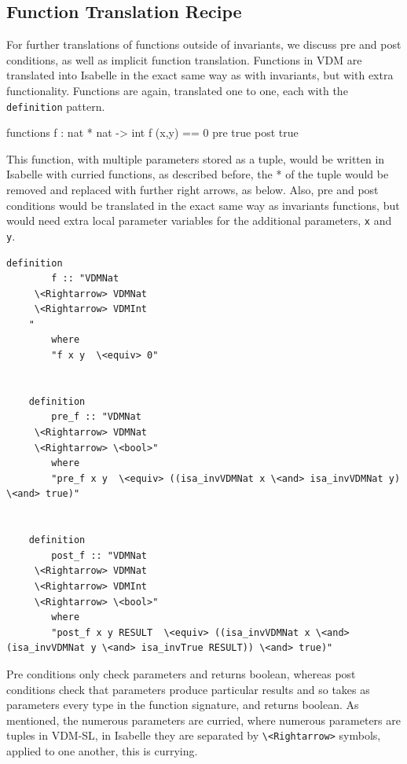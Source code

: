 	\subsection{Function Translation Recipe}
	For further translations of functions outside of invariants, we discuss pre and post conditions, as well as implicit function translation. Functions in VDM are translated into Isabelle in the exact same way as with invariants, but with extra functionality. Functions are again, translated one to one, each with the \lstinline[language=Isabelle]{definition} pattern.
	\begin{vdmsl}
	functions
	f : nat * nat -> int
	f (x,y) == 0
	pre true
	post true
	\end{vdmsl}
	This function, with multiple parameters stored as a tuple, would be written in Isabelle with curried functions, as described before, the * of the tuple would be removed and replaced with further right arrows, as below. Also, pre and post conditions would be translated in the exact same way as invariants functions, but would need extra local parameter variables for the additional parameters, \lstinline[language=Isabelle]{x} and \lstinline[language=Isabelle]{y}.
	\begin{lstlisting}[language=Isabelle]
	definition
		f :: "VDMNat
	 \<Rightarrow> VDMNat
	 \<Rightarrow> VDMInt
	"
	    where
	    "f x y  \<equiv> 0"


	definition
		pre_f :: "VDMNat
	 \<Rightarrow> VDMNat
	 \<Rightarrow> \<bool>"
	    where
	    "pre_f x y  \<equiv> ((isa_invVDMNat x \<and> isa_invVDMNat y) \<and> true)"


	definition
		post_f :: "VDMNat
	 \<Rightarrow> VDMNat
	 \<Rightarrow> VDMInt
	 \<Rightarrow> \<bool>"
	    where
	    "post_f x y RESULT  \<equiv> ((isa_invVDMNat x \<and> (isa_invVDMNat y \<and> isa_invTrue RESULT)) \<and> true)"
	\end{lstlisting}
	Pre conditions only check parameters and returns boolean, whereas post conditions check that parameters produce particular results and so takes as parameters every type in the function signature, and returns boolean. As mentioned, the numerous parameters are curried, where numerous parameters are tuples in VDM-SL, in Isabelle they are separated by \lstinline[language=Isabelle]{\<Rightarrow>} symbols, applied to one another, this is currying.

